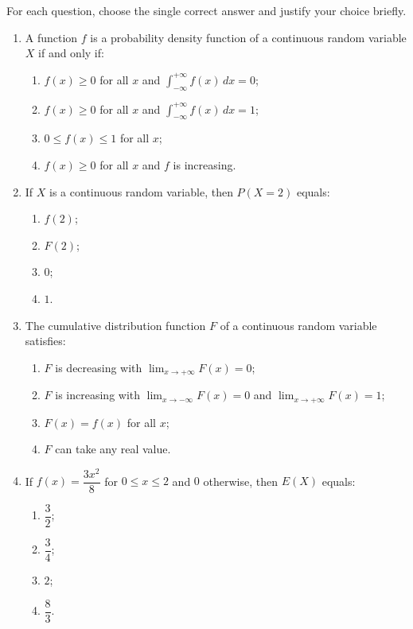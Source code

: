 \documentclass[11pt]{article}
\begin{document}
\begin{exercice}
For each question, choose the single correct answer and justify your choice briefly.
\begin{enumerate}
\item A function $f$ is a probability density function of a continuous random variable $X$ if and only if:
\begin{enumerate}
\item $f(x)\geq 0$ for all $x$ and $\displaystyle\int_{-\infty}^{+\infty} f(x)\,dx = 0$;
\item $f(x)\geq 0$ for all $x$ and $\displaystyle\int_{-\infty}^{+\infty} f(x)\,dx = 1$;
\item $0\leq f(x)\leq 1$ for all $x$;
\item $f(x)\geq 0$ for all $x$ and $f$ is increasing.
\end{enumerate}
\item If $X$ is a continuous random variable, then $P(X = 2)$ equals:
\begin{enumerate}
\item $f(2)$; \item $F(2)$; \item $0$; \item $1$.
\end{enumerate}
\item The cumulative distribution function $F$ of a continuous random variable satisfies:
\begin{enumerate}
\item $F$ is decreasing with $\lim_{x\to+\infty}F(x)=0$;
\item $F$ is increasing with $\lim_{x\to-\infty}F(x)=0$ and $\lim_{x\to+\infty}F(x)=1$;
\item $F(x)=f(x)$ for all $x$;
\item $F$ can take any real value.
\end{enumerate}
\item If $f(x)=\dfrac{3x^2}{8}$ for $0\leq x\leq 2$ and $0$ otherwise, then $E(X)$ equals:
\begin{enumerate}
\item $\dfrac{3}{2}$; \item $\dfrac{3}{4}$; \item $2$; \item $\dfrac{8}{3}$.
\end{enumerate}
\end{enumerate}
\end{exercice}
\end{document}
